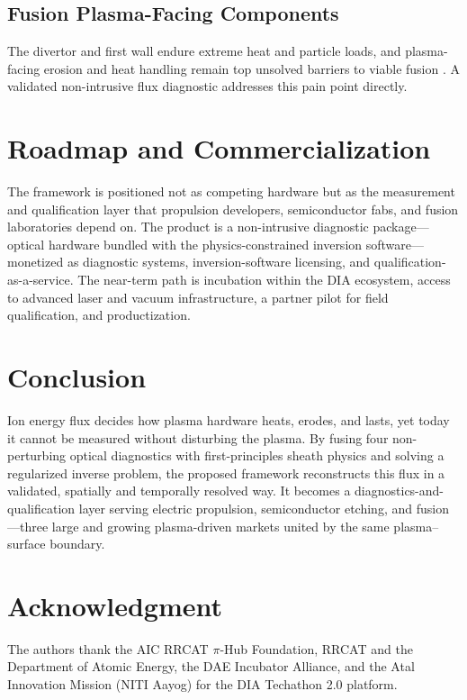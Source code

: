 \documentclass[conference]{IEEEtran}
\begin{document}
\subsection{Fusion Plasma-Facing Components}
The divertor and first wall endure extreme heat and particle loads, and plasma-facing erosion and heat handling remain top unsolved barriers to viable fusion \cite{ref0562,ref0563,ref0594,ref0595}. A validated non-intrusive flux diagnostic addresses this pain point directly.

\section{Roadmap and Commercialization}
The framework is positioned not as competing hardware but as the measurement and qualification layer that propulsion developers, semiconductor fabs, and fusion laboratories depend on. The product is a non-intrusive diagnostic package---optical hardware bundled with the physics-constrained inversion software---monetized as diagnostic systems, inversion-software licensing, and qualification-as-a-service. The near-term path is incubation within the DIA ecosystem, access to advanced laser and vacuum infrastructure, a partner pilot for field qualification, and productization.

\section{Conclusion}
Ion energy flux decides how plasma hardware heats, erodes, and lasts, yet today it cannot be measured without disturbing the plasma. By fusing four non-perturbing optical diagnostics with first-principles sheath physics and solving a regularized inverse problem, the proposed framework reconstructs this flux in a validated, spatially and temporally resolved way. It becomes a diagnostics-and-qualification layer serving electric propulsion, semiconductor etching, and fusion---three large and growing plasma-driven markets united by the same plasma--surface boundary.

\section*{Acknowledgment}
The authors thank the AIC RRCAT $\pi$-Hub Foundation, RRCAT and the Department of Atomic Energy, the DAE Incubator Alliance, and the Atal Innovation Mission (NITI Aayog) for the DIA Techathon 2.0 platform.

\printbibliography
\end{document}
